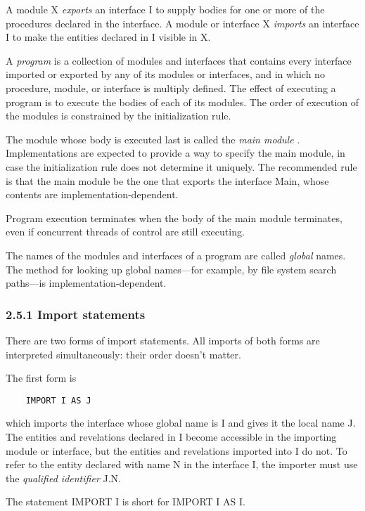 \documentclass[10pt]{article}
\begin{document}
  A module X \emph{exports}
 an interface I to supply bodies for one or more of the procedures declared in the interface. A module or interface X \emph{imports}
 an interface I to make the entities declared in I visible in X. 


 A \emph{program}
 is a collection of modules and interfaces that contains every interface imported or exported by any of its modules or interfaces, and in which no procedure, module, or interface is multiply defined. The effect of executing a program is to execute the bodies of each of its modules. The order of execution of the modules is constrained by the initialization rule. 


 The module whose body is executed last is called the \emph{main module}
. Implementations are expected to provide a way to specify the main module, in case the initialization rule does not determine it uniquely. The recommended rule is that the main module be the one that exports the interface Main, whose contents are implementation-dependent. 


 Program execution terminates when the body of the main module terminates, even if concurrent threads of control are still executing. 


  The names of the modules and interfaces of a program are called \emph{global}
 names. The method for looking up global names---for example, by file system search paths---is implementation-dependent. 


 
\subsubsection*{2.5.1 Import statements}


  There are two forms of import statements. All imports of both forms are interpreted simultaneously: their order doesn't matter. 


  The first form is  
\begin{verbatim}
    IMPORT I AS J
\end{verbatim}
 which imports the interface whose global name is I and gives it the local name J. The entities and revelations declared in I become accessible in the importing module or interface, but the entities and revelations imported into I do not. To refer to the entity declared with name N in the interface I, the importer must use the \emph{qualified identifier}
 J.N. 


  The statement IMPORT I is short for IMPORT I AS I. 
\end{document}
